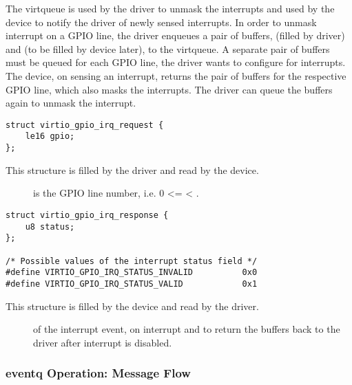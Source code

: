 The  virtqueue is used by the driver to unmask the interrupts and
used by the device to notify the driver of newly sensed interrupts. In order to
unmask interrupt on a GPIO line, the driver enqueues a pair of buffers,
 (filled by driver) and  (to be filled by device later), to the 
virtqueue. A separate pair of buffers must be queued for each GPIO line, the
driver wants to configure for interrupts. The device, on sensing an interrupt,
returns the pair of buffers for the respective GPIO line, which also masks the
interrupts. The driver can queue the buffers again to unmask the interrupt.

\begin{lstlisting}
struct virtio_gpio_irq_request {
    le16 gpio;
};
\end{lstlisting}

This structure is filled by the driver and read by the device.

\begin{description}
\item[] is the GPIO line number, i.e. 0 <=  <
    .
\end{description}

\begin{lstlisting}
struct virtio_gpio_irq_response {
    u8 status;
};

/* Possible values of the interrupt status field */
#define VIRTIO_GPIO_IRQ_STATUS_INVALID          0x0
#define VIRTIO_GPIO_IRQ_STATUS_VALID            0x1
\end{lstlisting}

This structure is filled by the device and read by the driver.

\begin{description}
\item[] of the interrupt event,
     on interrupt and
     to return the buffers back to the
    driver after interrupt is disabled.
\end{description}

\subsubsection{eventq Operation: Message Flow}\label{sec:Device Types / GPIO Device / eventq Operation / Message Flow}

